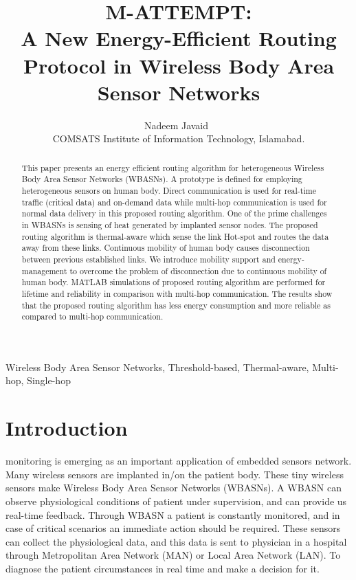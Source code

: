 \documentclass[journal]{IEEEtran}
\begin{document}
\title{M-ATTEMPT: \\A New Energy-Efficient Routing Protocol in Wireless Body Area Sensor Networks}
\author{Nadeem Javaid~ \\ COMSATS Institute of Information Technology, Islamabad.}


\maketitle
\begin{abstract}
This paper presents an energy efficient routing algorithm for heterogeneous Wireless Body Area Sensor Networks (WBASNs). A prototype is defined for employing heterogeneous sensors on human body. Direct communication is used for real-time traffic (critical data) and on-demand data while multi-hop communication is used for normal data delivery in this proposed routing algorithm. One of the prime challenges in WBASNs is sensing of heat generated by implanted sensor nodes. The proposed routing algorithm is thermal-aware which sense the link Hot-spot and routes the data away from these links. Continuous mobility of human body causes disconnection between previous established links. We introduce mobility support and energy-management to overcome the problem of disconnection due to continuous mobility of human body. MATLAB simulations of proposed routing algorithm are performed for lifetime and reliability in comparison with multi-hop communication. The results show that the proposed routing algorithm has less energy consumption and more reliable as compared to multi-hop communication.
\end{abstract}


\begin{IEEEkeywords}
Wireless Body Area Sensor Networks, Threshold-based, Thermal-aware, Multi-hop, Single-hop
\end{IEEEkeywords}

\section{Introduction}
 monitoring is emerging as an important application of embedded sensors network. Many wireless sensors are implanted in/on the patient body. These tiny wireless sensors make Wireless Body Area Sensor Networks (WBASNs). A WBASN can observe physiological conditions of patient under supervision, and can provide us real-time feedback. Through WBASN a patient is constantly monitored, and in case of critical scenarios an immediate action should be required. These sensors can collect the physiological data, and this data is sent to physician in a hospital through Metropolitan Area Network (MAN) or Local Area Network (LAN). To diagnose the patient circumstances in real time and make a decision for it.
\end{document}
